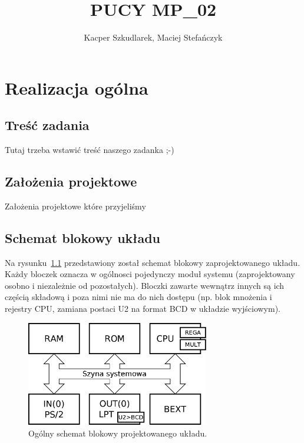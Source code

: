 \documentclass[a4paper,12pt]{report}
\author{Kacper Szkudlarek, Maciej Stefańczyk}
\title{PUCY MP\_02}
\begin{document}
\maketitle

\tableofcontents



\chapter{Realizacja ogólna}

\section{Treść zadania}

Tutaj trzeba wstawić treść naszego zadanka ;-)

\section{Założenia projektowe}

Założenia projektowe które przyjeliśmy

\section{Schemat blokowy układu}

Na rysunku~\ref{fig:block} przedstawiony został schemat blokowy zaprojektowanego układu. Każdy bloczek oznacza w ogólnosci pojedynczy moduł systemu (zaprojektowany osobno i niezależnie od pozostałych). Bloczki zawarte wewnątrz innych są ich częścią składową i poza nimi nie ma do nich dostępu (np. blok mnożenia i rejestry CPU, zamiana postaci U2 na format BCD w układzie wyjściowym).

\begin{figure}[h]
\centering
\includegraphics[width=8cm]{./pict/Block.png}
\caption{Ogólny schemat blokowy projektowanego układu.}
\label{fig:block}
\end{figure}
\end{document}
